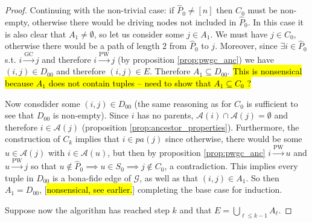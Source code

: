\documentclass[12pt]{article}
\def\gc{\overset{\text{GC}}{\rightarrow}}  %
\def\pwgc{\overset{\text{PW}}{\rightarrow}}  %
\def\gcg{\mathcal{G}}  %
\newcommand{\pa}[1]{pa(#1)}  %
\newcommand{\anc}[1]{\mathcal{A}(#1)}  %
\begin{document}
\begin{proof}
  Continuing with the non-trivial case: if $\widehat{P}_0 \ne [n]$ then $C_0$ must be non-empty, otherwise there would be driving nodes not included in $\widehat{P}_0$.  In this case it is also clear that $A_1 \ne \emptyset$, so let us consider some $j \in A_1$.  We must have $j \in C_0$, otherwise there would be a path of length $2$ from $\widehat{P}_0$ to $j$.  Moreover, since $\exists i \in \widehat{P}_0$ s.t. $i \gc j$ and therefore $i \pwgc j$ (by proposition \ref{prop:pwgc_anc}) we have $(i, j) \in D_{00}$ and therefore $(i, j) \in E$.  Therefore $A_1 \subseteq D_{00}$.  \hl{This is nonsensical because $A_1$ does not contain tuples -- need to show that $A_1 \subseteq C_0$ ?}

  Now consdider some $(i, j) \in D_{00}$ (the same reasoning as for $C_0$ is sufficient to see that $D_{00}$ is non-empty).  Since $i$ has no parents, $\anc{i} \cap \anc{j} = \emptyset$ and therefore $i \in \anc{j}$ (proposition \ref{prop:ancestor_properties}).  Furthermore, the construction of $C_k$ implies that $i \in \pa{j}$ since otherwise, there would be some $u \in \anc{j}$ with $i \in \anc{u}$, but then by proposition \ref{prop:pwgc_anc} $i \pwgc u$ and $u \pwgc j$ so that $u \not \in \widehat{P}_0 \implies u \in S_0 \implies j \not\in C_0$, a contradiction.  This implies every tuple in $D_{00}$ is a bona-fide edge of $\gcg$, as well as that $(i, j) \in A_1$.  So then $A_1 = D_{00}$, [\hl{nonsensical, see earlier.}] completing the base case for induction.

  Suppose now the algorithm has reached step $k$ and that $E = \bigcup_{\ell \le k - 1}A_\ell$.
  


\end{proof}
\end{document}
